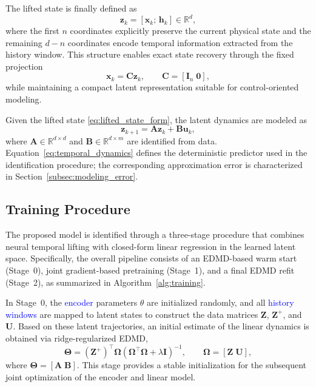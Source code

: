 \documentclass[journal]{IEEEtran}
\newcommand{\vx}{\mathbf{x}}
\newcommand{\vu}{\mathbf{u}}
\newcommand{\vz}{\mathbf{z}}
\newcommand{\vh}{\mathbf{h}}
\newcommand{\mA}{\mathbf{A}}
\newcommand{\mB}{\mathbf{B}}
\newcommand{\mC}{\mathbf{C}}
\newcommand{\mZ}{\mathbf{Z}}
\newcommand{\mU}{\mathbf{U}}
\newcommand{\mI}{\mathbf{I}}
\newcommand{\mTheta}{\boldsymbol{\Theta}}
\newcommand{\mOmega}{\boldsymbol{\Omega}}
\begin{document}
The lifted state is finally defined as
\begin{equation}
    \vz_k = [\vx_k;\,\vh_k] \in \mathbb{R}^{d},
    \label{eq:lifted_state_form}
\end{equation}
where the first $n$ coordinates explicitly preserve the current physical
state and the remaining $d-n$ coordinates encode temporal information
extracted from the history window. This structure enables exact state
recovery through the fixed projection
\begin{equation}
    \vx_k = \mC \vz_k, \qquad \mC = [\mI_n\;\mathbf{0}],
    \label{eq:decoder_projection}
\end{equation}
while maintaining a compact latent representation suitable for
control-oriented modeling.

Given the lifted state \eqref{eq:lifted_state_form}, the latent dynamics
are modeled as
\begin{equation}
    \vz_{k+1} = \mA \vz_k + \mB \vu_k,
    \label{eq:temporal_dynamics}
\end{equation}
where $\mA \in \mathbb{R}^{d\times d}$ and $\mB \in \mathbb{R}^{d\times m}$
are identified from data. Equation~\eqref{eq:temporal_dynamics} defines
the deterministic predictor used in the identification procedure; the
corresponding approximation error is characterized in
Section~\ref{subsec:modeling_error}.

\subsection{Training Procedure}
\label{sec:training}

The proposed model is identified through a three-stage procedure that
combines neural temporal lifting with closed-form linear regression in
the learned latent space. Specifically, the overall pipeline consists of
an EDMD-based warm start (Stage~0), joint gradient-based pretraining
(Stage~1), and a final EDMD refit (Stage~2), as summarized in
Algorithm~\ref{alg:training}.

In Stage~0, the \textcolor{blue}{encoder} parameters $\theta$ are initialized randomly,
and all \textcolor{blue}{history windows} are mapped to latent states to construct the
data matrices $\mZ$, $\mZ^{+}$, and $\mU$. Based on these latent
trajectories, an initial estimate of the linear dynamics is obtained via
ridge-regularized EDMD,
\begin{equation}
    \mTheta = (\mZ^{+})^\top \mOmega
    \left(\mOmega^\top \mOmega + \lambda \mI\right)^{-1},
    \qquad
    \mOmega = [\mZ\;\mU],
    \label{eq:edmd_solution}
\end{equation}
where $\mTheta = [\mA\;\mB]$. This stage provides a stable
initialization for the subsequent joint optimization of the encoder and
linear model.
\end{document}
